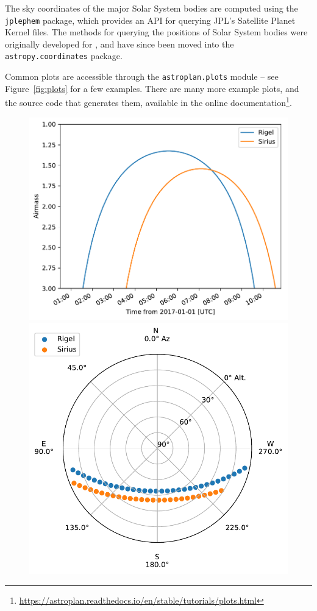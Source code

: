 The sky coordinates of the major Solar System bodies are computed using the \texttt{jplephem} package, which provides an API for querying JPL's Satellite Planet Kernel files. The methods for querying the positions of Solar System bodies were originally developed for \astroplan, and have since been moved into the \texttt{astropy.coordinates} package. 

Common plots are accessible through the \texttt{astroplan.plots} module -- see Figure~\ref{fig:plots} for a few examples. There are many more example plots, and the source code that generates them, available in the online documentation\footnote{\url{https://astroplan.readthedocs.io/en/stable/tutorials/plots.html}}.

\begin{figure}
\centering
\includegraphics[scale=0.5]{astroplan/airmass.pdf}
\includegraphics[scale=0.5]{astroplan/sky.pdf}

\end{figure}
